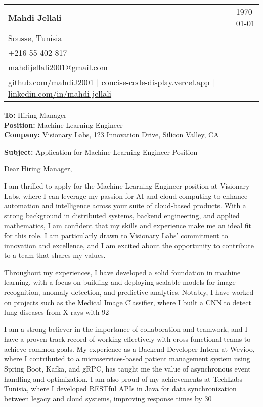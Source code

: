\documentclass[letterpaper,11pt]{article}
\makeatletter
\newcommand{\letterHeading}[5]{
    \begin{tabular*}{\textwidth}{l@{\extracolsep{\fill}}r}
    \textbf{\Large #1} & #5 \\  %
    #2 & \\
    #3 & \\
    #4 & \\
    \end{tabular*}
    \vspace{15pt}
}
\newcommand{\letterRecipient}[3]{
    \textbf{\large To:} #1 \\
    \textbf{\large Position:} #2 \\
    \textbf{\large Company:} #3 \\
    \vspace{12pt}
}
\newcommand{\letterSubject}[1]{
    \textbf{\large Subject:} #1 \\
    \vspace{15pt}
}
\makeatother
\begin{document}
    \letterHeading
    {Mahdi Jellali}
    {Sousse, Tunisia}
    {+216 55 402 817 \\ \href{mailto:mahdijellali2001@gmail.com}{mahdijellali2001@gmail.com}}
    {\href{https://github.com/mahdiJ2001}{github.com/mahdiJ2001} $|$ \href{https://concise-code-display.vercel.app/}{concise-code-display.vercel.app} $|$ \href{https://www.linkedin.com/in/mahdi-jellali/}{linkedin.com/in/mahdi-jellali}}
    {\today}

    \letterRecipient
    {Hiring Manager}
    {Machine Learning Engineer}
    {Visionary Labs, 123 Innovation Drive, Silicon Valley, CA}

    \letterSubject{Application for Machine Learning Engineer Position}

    Dear Hiring Manager,

    I am thrilled to apply for the Machine Learning Engineer position at Visionary Labs, where I can leverage my passion for AI and cloud computing to enhance automation and intelligence across your suite of cloud-based products. With a strong background in distributed systems, backend engineering, and applied mathematics, I am confident that my skills and experience make me an ideal fit for this role. I am particularly drawn to Visionary Labs' commitment to innovation and excellence, and I am excited about the opportunity to contribute to a team that shares my values.

    Throughout my experiences, I have developed a solid foundation in machine learning, with a focus on building and deploying scalable models for image recognition, anomaly detection, and predictive analytics. Notably, I have worked on projects such as the Medical Image Classifier, where I built a CNN to detect lung diseases from X-rays with 92%

    I am a strong believer in the importance of collaboration and teamwork, and I have a proven track record of working effectively with cross-functional teams to achieve common goals. My experience as a Backend Developer Intern at Wevioo, where I contributed to a microservices-based patient management system using Spring Boot, Kafka, and gRPC, has taught me the value of asynchronous event handling and optimization. I am also proud of my achievements at TechLabs Tunisia, where I developed RESTful APIs in Java for data synchronization between legacy and cloud systems, improving response times by 30%
\end{document}
